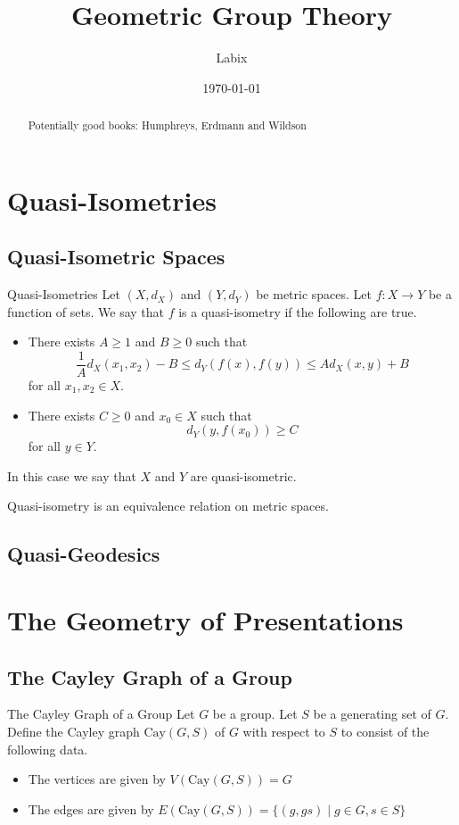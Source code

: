 \documentclass[a4paper]{article}
\title{Geometric Group Theory}
\author{Labix}
\date{\today}
\begin{document}
\maketitle
\begin{abstract}
Potentially good books: Humphreys, Erdmann and Wildson
\end{abstract}
\pagebreak
\tableofcontents

\pagebreak
\section{Quasi-Isometries}
\subsection{Quasi-Isometric Spaces}
\begin{defn}{Quasi-Isometries}{} Let $(X,d_X)$ and $(Y,d_Y)$ be metric spaces. Let $f:X\to Y$ be a function of sets. We say that $f$ is a quasi-isometry if the following are true. 
\begin{itemize}
\item There exists $A\geq 1$ and $B\geq 0$ such that $$\frac{1}{A}d_X(x_1,x_2)-B\leq d_Y(f(x),f(y))\leq Ad_X(x,y)+B$$ for all $x_1,x_2\in X$. 
\item There exists $C\geq 0$ and $x_0\in X$ such that $$d_Y(y,f(x_0))\geq C$$ for all $y\in Y$. 
\end{itemize}
In this case we say that $X$ and $Y$ are quasi-isometric. 
\end{defn}

\begin{prp}{}{} Quasi-isometry is an equivalence relation on metric spaces. 
\end{prp}

\subsection{Quasi-Geodesics}

\pagebreak
\section{The Geometry of Presentations}
\subsection{The Cayley Graph of a Group}
\begin{defn}{The Cayley Graph of a Group}{} Let $G$ be a group. Let $S$ be a generating set of $G$. Define the Cayley graph $\text{Cay}(G,S)$ of $G$ with respect to $S$ to consist of the following data. 
\begin{itemize}
\item The vertices are given by $V(\text{Cay}(G,S))=G$
\item The edges are given by $E(\text{Cay}(G,S))=\{(g,gs)\;|\;g\in G,s\in S\}$
\end{itemize}
\end{defn}
\end{document}
